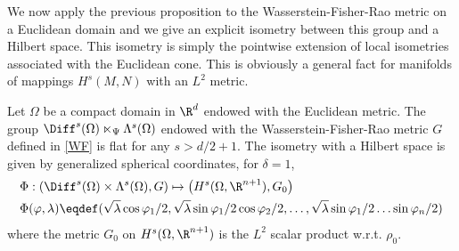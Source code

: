 We now apply the previous proposition to the Wasserstein-Fisher-Rao metric on a Euclidean domain and we give an explicit isometry between this group and a Hilbert space. This isometry is simply the pointwise extension of local isometries associated with the Euclidean cone. This is obviously a general fact for manifolds of mappings $H^s(M,N)$ with an $L^2$ metric.
\begin{corollary}
Let $\Omega$ be a compact domain in $\R^d$ endowed with the Euclidean metric.
The group $\Diff^{s}(\Omega) \ltimes_\Psi \Lambda^s(\Omega)$ endowed with the Wasserstein-Fisher-Rao metric $G$ defined in \eqref{WF} is flat for any $s> d/2+1$.
The isometry with a Hilbert space is given by generalized spherical coordinates, for $\delta = 1$,
\begin{align*}& \Phi : \left( \Diff^{s}(\Omega) \times \Lambda^s(\Omega) , G \right) \mapsto \left(H^{s}(\Omega,\R^{n+1}),G_0\right)\\
&\Phi(\varphi, \lambda) \eqdef (\sqrt{\lambda} \cos \varphi_1/2, \sqrt{\lambda} \sin \varphi_1/2\cos \varphi_2/2, \ldots, \sqrt{\lambda} \sin \varphi_1/2 \ldots \sin \varphi_{n}/2  )
\end{align*}
where the metric $G_0$ on $H^{s}(\Omega,\R^{n+1})$ is the $L^2$ scalar product w.r.t. $\rho_0$. 
\end{corollary}

